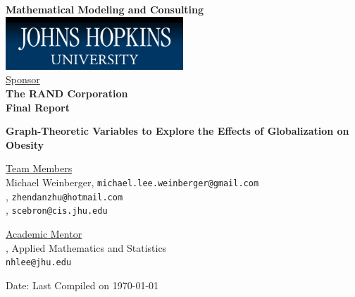 \documentclass[oneside,12pt]{report}
\begin{document}
\def\thefootnote{\fnsymbol{footnote}}

\thispagestyle{empty}

\def\shiftdowna{0.32in}  %
\def\shiftdownb{0.22in}  %


\begin{center}
\textbf{{\large Mathematical Modeling and Consulting }}\\

\vspace \shiftdowna
\includegraphics[width=0.5\textwidth]{jhu.png}\\

\vspace \shiftdowna
\underline {Sponsor}\\ 
\vspace{5pt}
\textbf{\large The RAND Corporation} \\
\vspace\shiftdowna
\textbf{{Final Report}}

\vspace \shiftdowna
\textbf{{\Large Graph-Theoretic Variables to Explore the Effects of Globalization on Obesity}}

\vspace{0.35in}
\underline {Team Members}\\

Michael Weinberger, \texttt{michael.lee.weinberger@gmail.com} \\
\vspace{3pt}
, \texttt{zhendanzhu@hotmail.com} \\
\vspace{3pt}
, \texttt{scebron@cis.jhu.edu}

\vspace \shiftdownb
\underline {Academic Mentor} \\
\vspace{5pt}
, Applied Mathematics and Statistics\\
\texttt{nhlee@jhu.edu}


\vspace \shiftdowna
Date: Last Compiled on \today

\end{center}
\end{document}
